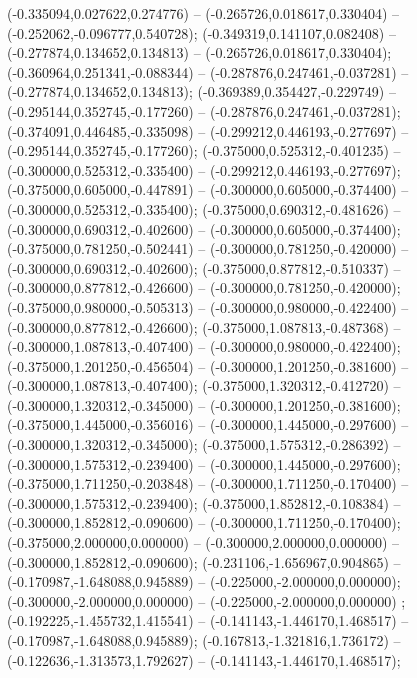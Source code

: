  (-0.335094,0.027622,0.274776) -- (-0.265726,0.018617,0.330404) -- (-0.252062,-0.096777,0.540728);
 (-0.349319,0.141107,0.082408) -- (-0.277874,0.134652,0.134813) -- (-0.265726,0.018617,0.330404);
 (-0.360964,0.251341,-0.088344) -- (-0.287876,0.247461,-0.037281) -- (-0.277874,0.134652,0.134813);
 (-0.369389,0.354427,-0.229749) -- (-0.295144,0.352745,-0.177260) -- (-0.287876,0.247461,-0.037281);
 (-0.374091,0.446485,-0.335098) -- (-0.299212,0.446193,-0.277697) -- (-0.295144,0.352745,-0.177260);
 (-0.375000,0.525312,-0.401235) -- (-0.300000,0.525312,-0.335400) -- (-0.299212,0.446193,-0.277697);
 (-0.375000,0.605000,-0.447891) -- (-0.300000,0.605000,-0.374400) -- (-0.300000,0.525312,-0.335400);
 (-0.375000,0.690312,-0.481626) -- (-0.300000,0.690312,-0.402600) -- (-0.300000,0.605000,-0.374400);
 (-0.375000,0.781250,-0.502441) -- (-0.300000,0.781250,-0.420000) -- (-0.300000,0.690312,-0.402600);
 (-0.375000,0.877812,-0.510337) -- (-0.300000,0.877812,-0.426600) -- (-0.300000,0.781250,-0.420000);
 (-0.375000,0.980000,-0.505313) -- (-0.300000,0.980000,-0.422400) -- (-0.300000,0.877812,-0.426600);
 (-0.375000,1.087813,-0.487368) -- (-0.300000,1.087813,-0.407400) -- (-0.300000,0.980000,-0.422400);
 (-0.375000,1.201250,-0.456504) -- (-0.300000,1.201250,-0.381600) -- (-0.300000,1.087813,-0.407400);
 (-0.375000,1.320312,-0.412720) -- (-0.300000,1.320312,-0.345000) -- (-0.300000,1.201250,-0.381600);
 (-0.375000,1.445000,-0.356016) -- (-0.300000,1.445000,-0.297600) -- (-0.300000,1.320312,-0.345000);
 (-0.375000,1.575312,-0.286392) -- (-0.300000,1.575312,-0.239400) -- (-0.300000,1.445000,-0.297600);
 (-0.375000,1.711250,-0.203848) -- (-0.300000,1.711250,-0.170400) -- (-0.300000,1.575312,-0.239400);
 (-0.375000,1.852812,-0.108384) -- (-0.300000,1.852812,-0.090600) -- (-0.300000,1.711250,-0.170400);
 (-0.375000,2.000000,0.000000) -- (-0.300000,2.000000,0.000000) -- (-0.300000,1.852812,-0.090600);
 (-0.231106,-1.656967,0.904865) -- (-0.170987,-1.648088,0.945889) -- (-0.225000,-2.000000,0.000000);
 (-0.300000,-2.000000,0.000000) -- (-0.225000,-2.000000,0.000000) ;
 (-0.192225,-1.455732,1.415541) -- (-0.141143,-1.446170,1.468517) -- (-0.170987,-1.648088,0.945889);
 (-0.167813,-1.321816,1.736172) -- (-0.122636,-1.313573,1.792627) -- (-0.141143,-1.446170,1.468517);
